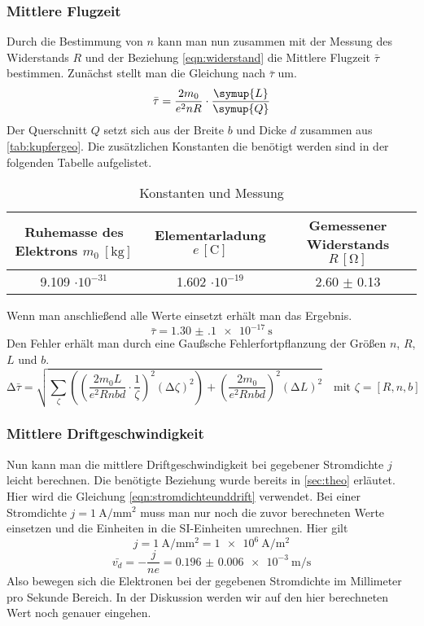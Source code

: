 \subsubsection{Mittlere Flugzeit}
Durch die Bestimmung von $n$ kann man nun zusammen mit der Messung des Widerstands $R$ und der Beziehung \eqref{eqn:widerstand} die Mittlere Flugzeit $\bar{\tau}$ bestimmen. 
Zunächst stellt man die Gleichung nach $\bar{\tau}$ um.
\begin{equation}
\bar{\tau} = \frac{2m_{0}}{e^{2}n R} \cdot \frac{\symup{L}}{\symup{Q}}
\end{equation}
Der Querschnitt $Q$ setzt sich aus der Breite $b$ und Dicke $d$ zusammen aus \ref{tab:kupfergeo}.
Die zusätzlichen Konstanten die benötigt werden sind in der folgenden Tabelle aufgelistet.
\begin{table}
  \centering
  \caption{Konstanten und Messung}
  \label{tab:konstantenrechnung}
  \begin{tabular}{c c c}
    Ruhemasse des Elektrons {$m_{0} \: [\si{\kilo\gram}]$} & Elementarladung {$e \, [\si{\coulomb}]$} & Gemessener Widerstands {$R \, [\si{\ohm}]$}\\
    \midrule
    9.109 $\cdot 10^{-31}$   & 1.602 $\cdot 10^{-19}$ & 2.60 $\pm$ 0.13\\
    \bottomrule
  \end{tabular}
\end{table}
Wenn man anschließend alle Werte einsetzt erhält man das Ergebnis.
\begin{equation}
\bar{\tau} = \SI{1.30(10)e-17}{\second}
\end{equation}
Den Fehler erhält man durch eine Gaußsche Fehlerfortpflanzung der Größen $n$, $R$, $L$ und $b$.
\begin{equation}
\increment \bar{\tau} = \sqrt{\sum_{\zeta}\left( \left( \frac{2m_{0}L}{e^{2}Rnbd} \cdot \frac{1}{\zeta}\right)^{2} (\increment \zeta)^2 \right) + \left( \frac{2m_{0}}{e^{2}Rnbd} \right)^{2} (\increment L)^{2}} \quad \text{mit } \zeta =[R, n, b]
\end{equation}

\subsubsection{Mittlere Driftgeschwindigkeit}
Nun kann man die mittlere Driftgeschwindigkeit bei gegebener Stromdichte $j$ leicht berechnen. Die benötigte Beziehung wurde bereits in \ref{sec:theo} erläutet.
Hier wird die Gleichung \eqref{eqn:stromdichteunddrift} verwendet. Bei einer Stromdichte $j = \SI{1}{\ampere\per\milli\meter\squared}$ muss man nur noch die zuvor berechneten Werte einsetzen und
die Einheiten in die SI-Einheiten umrechnen. Hier gilt
\begin{equation}
j = \SI{1}{\ampere\per\milli\meter\squared} = \SI{1e6}{\ampere\per\meter\squared}
\end{equation}
\begin{equation}
\bar{v_{d}} = - \frac{j}{n e} = \SI{0.196(6)e-3}{\meter\per\second}
\end{equation}
Also bewegen sich die Elektronen bei der gegebenen Stromdichte im Millimeter pro Sekunde Bereich. In der Diskussion werden wir auf den 
hier berechneten Wert noch genauer eingehen.
